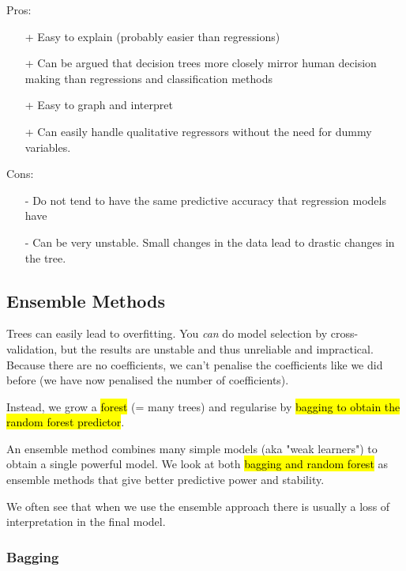 \documentclass[11pt]{article}
\begin{document}
\begin{shaded}
    Pros:
    \begin{itemize}
        \item[+] Easy to explain (probably easier than regressions)
        \item[+] Can be argued that decision trees more closely mirror human decision making than regressions and classification methods
        \item[+] Easy to graph and interpret
        \item[+] Can easily handle qualitative regressors without the need for dummy variables.
    \end{itemize}

    Cons:
    \begin{itemize}
        \item[-] Do not tend to have the same predictive accuracy that regression models have 
        \item[-] Can be very unstable. Small changes in the data lead to drastic changes in the tree.
    \end{itemize}
\end{shaded}


\subsection{Ensemble Methods}


Trees can easily lead to overfitting. You \textit{can} do model selection by cross-validation, but the results are unstable and thus unreliable and impractical. Because there are no coefficients, we can't penalise the coefficients like we did before (we have now penalised the number of coefficients). 

Instead, we grow a \hl{forest} (= many trees) and regularise by \hl{bagging to obtain the random forest predictor}.



An ensemble method combines many simple models (aka "weak learners") to obtain a single powerful model. We look at both \hl{bagging and random forest} as ensemble methods that give better predictive power and stability.

\begin{note}
    We often see that when we use the ensemble approach there is usually a loss of interpretation in the final model.
\end{note}

\subsubsection{Bagging}
\end{document}
